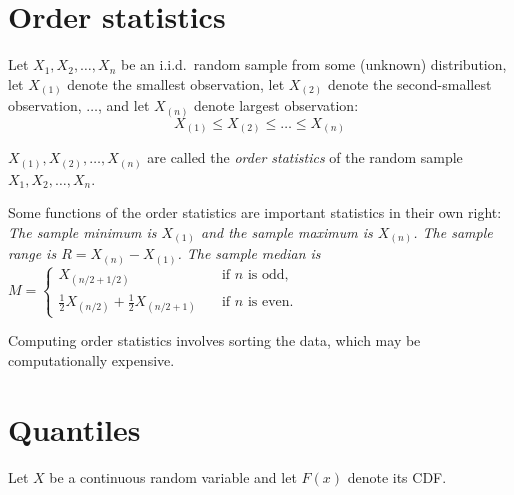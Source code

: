 
\section{Order statistics}
Let $X_1,X_2,\ldots,X_n$ be an i.i.d.\ random sample from some (unknown) distribution, let $X_{(1)}$ denote the smallest observation, let $X_{(2)}$ denote the second-smallest observation, $\ldots$, and let $X_{(n)}$ denote largest observation: 
\[
X_{(1)} \leq X_{(2)} \leq \ldots \leq X_{(n)}
\]

\begin{definition}
$X_{(1)}, X_{(2)}, \ldots, X_{(n)}$ are called the \emph{order statistics} of the random sample $X_1,X_2,\ldots,X_n$.
\end{definition}

Some functions of the order statistics are important statistics in their own right:
\bit
\it The \emph{sample minimum} is $X_{(1)}$ and the \emph{sample maximum} is $X_{(n)}$.
\it The \emph{sample range} is $R = X_{(n)} - X_{(1)}$.
\it The \emph{sample median} is $M = \begin{cases} X_{(n/2+1/2)} & \quad\text{if $n$ is odd,} \\[2ex] \frac{1}{2}X_{(n/2)}+\frac{1}{2}X_{(n/2+1)} & \quad\text{if $n$ is even.} \end{cases}$
\eit
\vspace*{-2ex}
\begin{remark}
Computing order statistics involves sorting the data, which may be computationally expensive.
\end{remark}


\section{Quantiles}
Let $X$ be a continuous random variable and let $F(x)$ denote its CDF.

